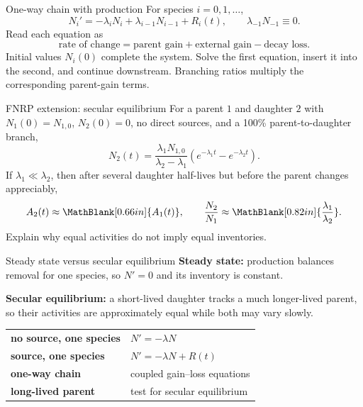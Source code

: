 \begin{handoutcolumns}
\switchcolumn


\begin{fixedbox}{One-way chain with production}
For species $i=0,1,\ldots$,
\[
 \boxed{N_i'
 =-\lambda_iN_i
 +\lambda_{i-1}N_{i-1}
 +R_i(t)},
 \qquad \lambda_{-1}N_{-1}\equiv0.
\]
Read each equation as
\[
 \text{rate of change}=\text{parent gain}+\text{external gain}-\text{decay loss}.
\]
Initial values $N_i(0)$ complete the system.  Solve the first equation, insert
it into the second, and continue downstream.  Branching ratios multiply the
corresponding parent-gain terms.
\end{fixedbox}

\begin{boardbox}{FNRP extension: secular equilibrium}
For a parent $1$ and daughter $2$ with $N_1(0)=N_{1,0}$, $N_2(0)=0$, no direct
sources, and a 100\% parent-to-daughter branch,
\[
 N_2(t)=\frac{\lambda_1N_{1,0}}{\lambda_2-\lambda_1}
 \left(e^{-\lambda_1t}-e^{-\lambda_2t}\right).
\]
If $\lambda_1\ll\lambda_2$, then after several daughter half-lives but before
the parent changes appreciably,
\[
 A_2(t)\approx\MathBlank[0.66in]{A_1(t)},
 \qquad
 \frac{N_2}{N_1}\approx\MathBlank[0.82in]{\frac{\lambda_1}{\lambda_2}}.
\]
Explain why equal activities do not imply equal inventories.
\end{boardbox}

\begin{fixedbox}{Steady state versus secular equilibrium}
\textbf{Steady state:} production balances removal for one species, so
$N'=0$ and its inventory is constant.\par
\smallskip
\textbf{Secular equilibrium:} a short-lived daughter tracks a much
longer-lived parent, so their activities are approximately equal while both
may vary slowly.
\end{fixedbox}

\begin{takeawaybox}
\begin{tabularx}{\linewidth}{@{}>{\bfseries}l X@{}}
no source, one species & $N'=-\lambda N$\\
source, one species & $N'=-\lambda N+R(t)$\\
one-way chain & coupled gain--loss equations\\
long-lived parent & test for secular equilibrium
\end{tabularx}
\end{takeawaybox}

\end{handoutcolumns}

